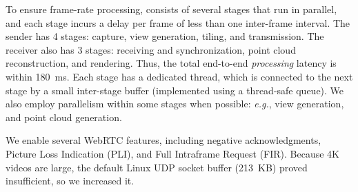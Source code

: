%
To ensure frame-rate processing, \livo{} consists of several stages that run in parallel, and each stage incurs a delay per frame of less than one inter-frame interval.
%
The sender has 4 stages: capture, view generation, tiling, and transmission.
The receiver also has 3 stages: receiving and synchronization, point cloud reconstruction, and rendering.
%
%
Thus, the total end-to-end \textit{processing} latency is within 180~ms.
%
Each stage has a dedicated thread, which is connected to the next stage by a small inter-stage buffer (implemented using a thread-safe queue).
%
We also employ parallelism within some stages when possible: \textit{e.g.}, view generation, and point cloud generation.

%
We enable several WebRTC features, including negative acknowledgments, Picture Loss Indication (PLI), and Full Intraframe Request (FIR).
%
Because 4K videos are large, the default Linux UDP socket buffer (213~KB) proved insufficient, so we increased it.

%




